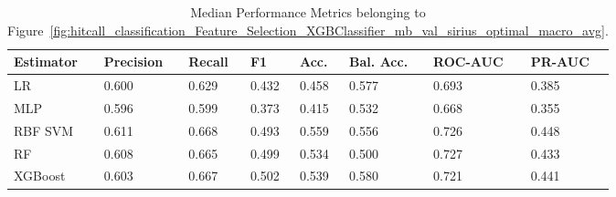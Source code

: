 \begin{longtable}{llllllll}
\caption{Median Performance Metrics belonging to Figure~\ref{fig:hitcall_classification_Feature_Selection_XGBClassifier_mb_val_sirius_optimal_macro_avg}.}\label{tab:table:hitcall_classification_feature_selection_xgbclassifier_mb_val_sirius_optimal_macro_avg}\\
\toprule
\midrule
\small Estimator & \small Precision & \small Recall & \small F1 & \small Acc. & \small Bal. Acc. & \small ROC-AUC & \small PR-AUC\\
\hline
LR & 0.600 & 0.629 & 0.432 & 0.458 & 0.577 & 0.693 & 0.385\\
MLP & 0.596 & 0.599 & 0.373 & 0.415 & 0.532 & 0.668 & 0.355\\
RBF SVM & 0.611 & 0.668 & 0.493 & 0.559 & 0.556 & 0.726 & 0.448\\
RF & 0.608 & 0.665 & 0.499 & 0.534 & 0.500 & 0.727 & 0.433\\
XGBoost & 0.603 & 0.667 & 0.502 & 0.539 & 0.580 & 0.721 & 0.441\\
\bottomrule
\end{longtable}